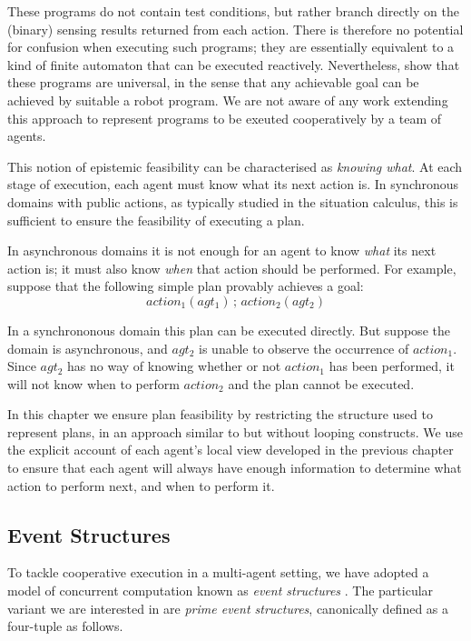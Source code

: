 These programs do not contain test conditions, but rather branch directly
on the (binary) sensing results returned from each action. There is
therefore no potential for confusion when executing such programs;
they are essentially equivalent to a kind of finite automaton that
can be executed reactively. Nevertheless, \citet{levesque98what_robots_can_do}
show that these programs are universal, in the sense that any achievable
goal can be achieved by suitable a robot program. We are not aware
of any work extending this approach to represent programs to be exeuted
cooperatively by a team of agents.

This notion of epistemic feasibility can be characterised as \emph{knowing
what}. At each stage of execution, each agent must know what its next
action is. In synchronous domains with public actions, as typically
studied in the situation calculus, this is sufficient to ensure the
feasibility of executing a plan.

In asynchronous domains it is not enough for an agent to know \emph{what}
its next action is; it must also know \emph{when} that action should
be performed. For example, suppose that the following simple plan
provably achieves a goal:\[
action_{1}(agt_{1})\,;\, action_{2}(agt_{2})\]


In a synchrononous domain this plan can be executed directly. But
suppose the domain is asynchronous, and $agt_{2}$ is unable to observe
the occurrence of $action_{1}$. Since $agt_{2}$ has no way of knowing
whether or not $action_{1}$ has been performed, it will not know
when to perform $action_{2}$ and the plan cannot be executed.

In this chapter we ensure plan feasibility by restricting the structure
used to represent plans, in an approach similar to \citep{levesque98what_robots_can_do}
but without looping constructs. We use the explicit account of each
agent's local view developed in the previous chapter to ensure that
each agent will always have enough information to determine what action
to perform next, and when to perform it.


\subsection{Event Structures}

To tackle cooperative execution in a multi-agent setting, we have
adopted a model of concurrent computation known as \emph{event structures}
\citep{npw79event_structures}. The particular variant we are interested
in are \emph{prime event structures}, canonically defined as a four-tuple
as follows.

